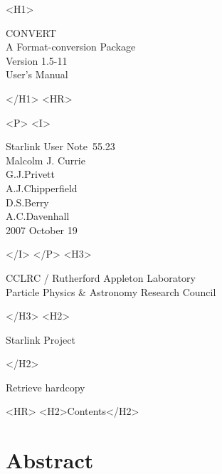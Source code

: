 \documentclass[twoside,11pt]{article}
\newcommand{\stardoccategory}  {Starlink User Note}
\newcommand{\stardocsource}    {sun\stardocnumber}
\newcommand{\stardocnumber}    {55.23}
\newcommand{\stardocauthors}   {Malcolm J. Currie\\
                                G.J.Privett\\
                                A.J.Chipperfield\\
                                D.S.Berry\\
                                A.C.Davenhall}
\newcommand{\stardocdate}      {2007 October 19}
\newcommand{\stardoctitle}     {CONVERT\\
                                A Format-conversion Package}
\newcommand{\stardocversion}   {Version 1.5-11}
\newcommand{\stardocmanual}    {User's Manual}
\newcommand{\htmladdnormallink}[2]{#1}
\newcommand{\htmladdimg}[1]{}
\newcommand{\htmlref}[2]{#1}
\newcommand{\htmladdtonavigation}[1]{}
\newcommand{\xlabel}[1]{}
\begin{document}
\begin{htmlonly}
   \xlabel{}
   \begin{rawhtml} <H1> \end{rawhtml}
      \stardoctitle\\
      \stardocversion\\
      \stardocmanual
   \begin{rawhtml} </H1> <HR> \end{rawhtml}


   \begin{rawhtml} <P> <I> \end{rawhtml}
   \stardoccategory\ \stardocnumber \\
   \stardocauthors \\
   \stardocdate
   \begin{rawhtml} </I> </P> <H3> \end{rawhtml}
      \htmladdnormallink{CCLRC / Rutherford Appleton Laboratory}
                        {http://www.cclrc.ac.uk} \\
      \htmladdnormallink{Particle Physics \& Astronomy Research Council}
                        {http://www.pparc.ac.uk} \\
   \begin{rawhtml} </H3> <H2> \end{rawhtml}
      \htmladdnormallink{Starlink Project}{http://www.starlink.rl.ac.uk/}
   \begin{rawhtml} </H2> \end{rawhtml}
   \htmladdnormallink{\htmladdimg{source.gif} Retrieve hardcopy}
      {http://www.starlink.rl.ac.uk/cgi-bin/hcserver?\stardocsource}\\

  \label{stardoccontents}
  \begin{rawhtml} 
    <HR>
    <H2>Contents</H2>
  \end{rawhtml}
  \htmladdtonavigation{\htmlref{\htmladdimg{contents_motif.gif}}
        {stardoccontents}}

  \section{\xlabel{abstract}Abstract}
\end{htmlonly}
\end{document}
